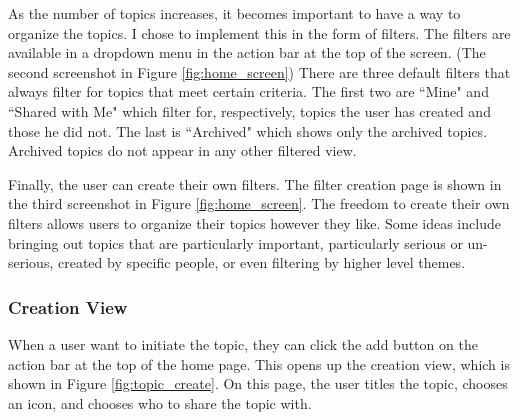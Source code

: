       As the number of topics increases,
      it becomes important to have a way to organize the topics.
      I chose to implement this in the form of filters.
      The filters are available in a dropdown menu in the action bar at the top of the screen.
      (The second screenshot in Figure \ref{fig:home_screen})
      There are three default filters that always filter for topics that meet certain criteria.
      The first two are ``Mine" and ``Shared with Me"
      which filter for, respectively, topics the user has created and those he did not.
      The last is ``Archived" which shows only the archived topics.
      Archived topics do not appear in any other filtered view.

      Finally, the user can create their own filters.
      The filter creation page is shown in the third screenshot in Figure \ref{fig:home_screen}.
      The freedom to create their own filters allows users to organize
      their topics however they like.
      Some ideas include bringing out topics that are particularly important,
      particularly serious or un-serious, created by specific people,
      or even filtering by higher level themes.

      \subsubsection{Creation View}
      When a user want to initiate the topic,
      they can click the add button on the action bar at the top of the home page.
      This opens up the creation view, which is shown in Figure \ref{fig:topic_create}.
      On this page, the user titles the topic,
      chooses an icon, and chooses who to share the topic with.

